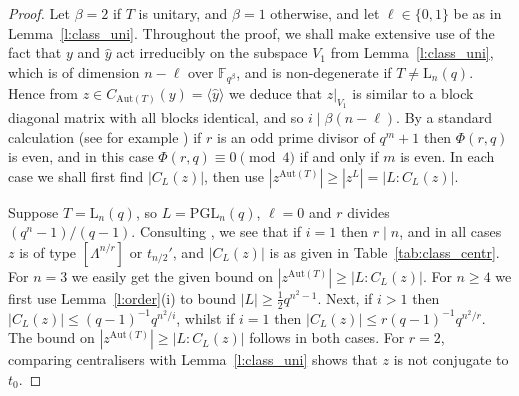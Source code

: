 \documentclass[twoside,a4paper,reqno,11pt]{amsart}
\newcommand{\wy}{\widehat{y}}
\newcommand\bbF{\mathbb{F}}
\newcommand{\<}{\langle}
\renewcommand{\>}{\rangle}
\newcommand{\la}{\langle}
\newcommand{\ra}{\rangle}
\newcommand{\leqs}{\leqslant}
\newcommand{\geqs}{\geqslant}
\newcommand{\Aut}{\mathrm{Aut}}
\newcommand{\GL}{\mathrm{GL}}
\newcommand{\PGL}{\mathrm{PGL}}
\newcommand{\LL}{\mathrm{L}}
\newcommand{\cmrd}{\textcolor{blue}}
\theoremstyle{definition}
\begin{document}
\begin{proof}
    Let $\beta = 2$ %
    if $T$ is unitary, and $\beta = 1$ otherwise, and let $\ell \in \{0, 1\}$ be as in Lemma~\ref{l:class_uni}.
    Throughout the proof, we shall make extensive use of the fact that $y$ and $\wy$ act irreducibly on the subspace $V_{1}$ from Lemma~\ref{l:class_uni}, which is
    of dimension $n-\ell$ over $\bbF_{q^\beta}$, and is non-degenerate if $T \neq \LL_n(q)$. 
    Hence from $z \in C_{\Aut(T)}(y) = \la \wy \ra$ we deduce that $z|_{V_{1}}$ is similar to a block diagonal matrix with all blocks identical, and so 
    $i \mid \beta(n-\ell)$. By a standard calculation (see for example \cite[Lemma A.1]{BG_classical}) if $r$ is an odd prime divisor of $q^m+1$ then $\Phi(r, q)$ is even, and  in this case $\Phi(r, q) \equiv 0 \pmod 4$ if and only if $m$ is even.
    In each case we shall first find $|C_{L}(z)|$, then use $|z^{\Aut(T)}| \geqs |z^L| = |L:C_L(z)|$. 

    Suppose $T = \LL_n(q)$, so $L = \PGL_n(q)$, $\ell = 0$ and $r$ divides $(q^n-1)/(q-1)$. Consulting \cite[Tables~B.1 and B.3]{BG_classical}, we see that if $i = 1$ then $r \mid n$, and in all cases $z$ is of type $[\Lambda^{n/r}]$ or $t_{n/2}'$, and  $|C_{L}(z)|$ is as given in Table~\ref{tab:class_centr}.  
    For $n = 3$ we easily get the given bound on $|z^{\Aut(T)}| \geqs |L:C_L(z)|$. 
    For $n \geqs 4$ we first use Lemma~\ref{l:order}(i) to bound $|L| \geqs \frac{1}{2}q^{n^2-1}$. Next, if $i > 1$ then $|C_L(z)| \leqs (q-1)^{-1}q^{n^2/i}$, whilst if $i = 1$ then $|C_L(z)|  \leqs r(q-1)^{-1}q^{n^2/r}$. The bound on $|z^{\Aut(T)}| \geqs |L:C_L(z)|$ follows in both cases.
    For $r = 2$, comparing centralisers with Lemma~\ref{l:class_uni} shows that $z$ is not conjugate to $t_0$.
	


\end{proof}
\end{document}
